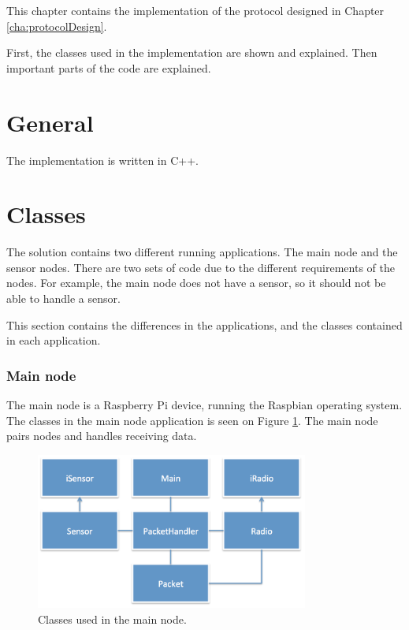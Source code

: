 This chapter contains the implementation of the protocol designed in Chapter \ref{cha:protocolDesign}. 

First, the classes used in the implementation are shown and explained. Then important parts of the code are explained.
 

\section{General}
The implementation is written in C++.

\section{Classes}
The solution contains two different running applications. The main node and the sensor nodes. There are two sets of code due to the different requirements of the nodes. For example, the main node does not have a sensor, so it should not be able to handle a sensor.

This section contains the differences in the applications, and the classes contained in each application.

\subsubsection*{Main node}
The main node is a Raspberry Pi device, running the Raspbian operating system. The classes in the main node application is seen on Figure \ref{fig:mainnodeClass}.
The main node pairs nodes and handles receiving data.

\begin{figure}[h!]
\centering
\includegraphics[width=0.8\textwidth]{chapters/implementation/figures/mainnodeClass.png}
\caption{Classes used in the main node.}
\label{fig:mainnodeClass}
\end{figure}



